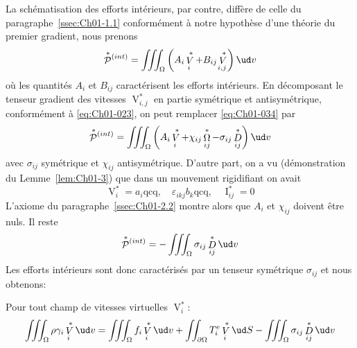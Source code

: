 La schématisation des efforts intérieurs, par contre, diffère de celle du paragraphe~\ref{ssec:Ch01-1.1} conformément à notre hypothèse d'une théorie du premier gradient, nous prenons
\begin{equation}
    \mathop{\mathcal{P}}^{\ast}{\!}^{(int)} = \iiint_{\Omega} \left( A_i \mathop{V}^{\ast}_i + B_{ij} \mathop{V}^{\ast}_{i,j} \right) \ud v
    \label{eq:Ch01-034}
\end{equation}
où les quantités $A_i$ et $B_{ij}$ caractérisent les efforts intérieurs.
En décomposant le tenseur gradient des vitesses $\mathop{V}^{\ast}_{i,j}$ en partie symétrique et antisymétrique, conformément à \eqref{eq:Ch01-023}, on peut remplacer \eqref{eq:Ch01-034} par
\begin{equation}
    \mathop{\mathcal{P}}^{\ast}{\!}^{(int)} = \iiint_{\Omega} \left( A_i \mathop{V}^{\ast}_i + \chi_{ij} \mathop{\Omega}^{\ast}_{ij} - \sigma_{ij} \mathop{D}^{\ast}_{ij} \right) \ud v
    \label{eq:Ch01-035} 
\end{equation}
avec $\sigma_{ij}$ symétrique et $\chi_{ij}$ antisymétrique.
D'autre part, on a vu (démonstration du Lemme~\ref{lem:Ch01-3}) que dans un mouvement rigidifiant on avait
\begin{equation}
    \mathop{V}^{\ast}_i = a_i \text{qcq}, \quad \varepsilon_{ikj} b_k \text{qcq}, \quad \mathop{I}^{\ast}_{ij} = 0
    \label{eq:Ch01-036}
\end{equation}
L'axiome du paragraphe~\ref{ssec:Ch01-2.2} montre alors que $A_i$ et $\chi_{ij}$ doivent être nuls.
Il reste
\begin{equation}
    \mathop{\mathcal{P}}^{\ast}{\!}^{(int)} = -\iiint_{\Omega} \sigma_{ij} \mathop{D}^{\ast}_{ij} \ud v
    \label{eq:Ch01-037}
\end{equation}
Les efforts intérieurs sont donc caractérisés par un tenseur symétrique $\sigma_{ij}$ et nous obtenons:
\begin{Principe}
Pour tout champ de vitesses virtuelles $\mathop{V}^{\ast}_i$:
    \begin{equation}
        \iiint_{\Omega} \rho \gamma_i \mathop{V}^{\ast}_i \ud v = \iiint_{\Omega} f_i \mathop{V}^{\ast}_i \ud v + \iint_{\partial \Omega} T_i^e \mathop{V}^{\ast}_i \ud S - \iiint_{\Omega} \sigma_{ij} \mathop{D}^{\ast}_{ij} \ud v
        \label{eq:Ch01-038}
    \end{equation}
\end{Principe}

